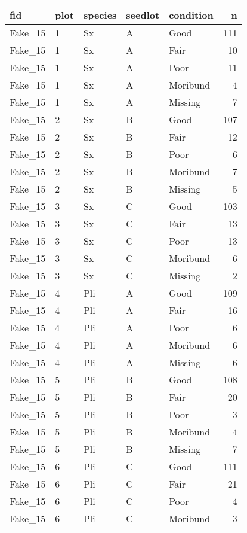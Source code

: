\documentclass[
]{article}
\begin{document}
\begin{tabular}{l|l|l|l|l|r}
\hline
fid & plot & species & seedlot & condition & n\\
\hline
Fake\_15 & 1 & Sx & A & Good & 111\\
\hline
Fake\_15 & 1 & Sx & A & Fair & 10\\
\hline
Fake\_15 & 1 & Sx & A & Poor & 11\\
\hline
Fake\_15 & 1 & Sx & A & Moribund & 4\\
\hline
Fake\_15 & 1 & Sx & A & Missing & 7\\
\hline
Fake\_15 & 2 & Sx & B & Good & 107\\
\hline
Fake\_15 & 2 & Sx & B & Fair & 12\\
\hline
Fake\_15 & 2 & Sx & B & Poor & 6\\
\hline
Fake\_15 & 2 & Sx & B & Moribund & 7\\
\hline
Fake\_15 & 2 & Sx & B & Missing & 5\\
\hline
Fake\_15 & 3 & Sx & C & Good & 103\\
\hline
Fake\_15 & 3 & Sx & C & Fair & 13\\
\hline
Fake\_15 & 3 & Sx & C & Poor & 13\\
\hline
Fake\_15 & 3 & Sx & C & Moribund & 6\\
\hline
Fake\_15 & 3 & Sx & C & Missing & 2\\
\hline
Fake\_15 & 4 & Pli & A & Good & 109\\
\hline
Fake\_15 & 4 & Pli & A & Fair & 16\\
\hline
Fake\_15 & 4 & Pli & A & Poor & 6\\
\hline
Fake\_15 & 4 & Pli & A & Moribund & 6\\
\hline
Fake\_15 & 4 & Pli & A & Missing & 6\\
\hline
Fake\_15 & 5 & Pli & B & Good & 108\\
\hline
Fake\_15 & 5 & Pli & B & Fair & 20\\
\hline
Fake\_15 & 5 & Pli & B & Poor & 3\\
\hline
Fake\_15 & 5 & Pli & B & Moribund & 4\\
\hline
Fake\_15 & 5 & Pli & B & Missing & 7\\
\hline
Fake\_15 & 6 & Pli & C & Good & 111\\
\hline
Fake\_15 & 6 & Pli & C & Fair & 21\\
\hline
Fake\_15 & 6 & Pli & C & Poor & 4\\
\hline
Fake\_15 & 6 & Pli & C & Moribund & 3\\

\end{tabular}
\end{document}
